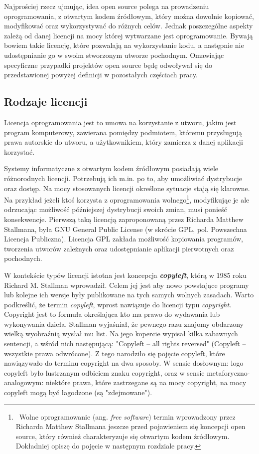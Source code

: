 \documentclass{article}
\begin{document}
Najprościej rzecz ujmując, idea open source polega na prowadzeniu oprogramowania, z otwartym kodem źródłowym, który można dowolnie kopiować, modyfikować oraz wykorzystywać do różnych celów. Jednak poszczególne aspekty zależą od danej licencji na mocy której wytwarzane jest oprogramowanie. Bywają bowiem takie licencję, które pozwalają na wykorzystanie kodu, a następnie nie udostępnianie go w swoim stworzonym utworze pochodnym. Omawiając specyficzne przypadki projektów open source będę odwoływał się do przedstawionej powyżej definicji w pozostałych częściach pracy.

\subsection{Rodzaje licencji}

\hspace{4mm} Licencja oprogramowania jest to umowa na korzystanie z utworu, jakim jest program komputerowy, zawierana pomiędzy podmiotem, któremu przysługują prawa autorskie do utworu, a użytkownikiem, który zamierza z danej aplikacji korzystać\cite{wikipedia}.

Systemy informatyczne z otwartym kodem źródłowym posiadają wiele różnorodnych licencji. Potrzebują ich m.in. po to, aby umożliwiać dystrybucje oraz dostęp. Na mocy stosowanych licencji określone sytuacje stają się klarowne. Na przykład jeżeli ktoś korzysta z oprogramowania wolnego\footnote{\, Wolne oprogramowanie (ang. \emph{free software}) termin wprowadzony przez Richarda Matthew Stallmana jeszcze przed pojawieniem się koncepcji open source, który również charakteryzuje się otwartym kodem źródłowym. Dokładniej opiszę do pojęcie w następnym rozdziale pracy.}, modyfikując je ale odrzucając możliwość późniejszej dystrybucji swoich zmian, musi ponieść konsekwencje. Pierwszą taką licencją zaproponowaną przez Richarda Matthew Stallmana, była GNU General Public License (w skrócie GPL, pol. Powszechna Licencja Publiczna)\cite{Kotula}. Licencja GPL zakłada możliwość kopiowania programów, tworzenia utworów zależnych oraz udostępnianie aplikacji pierwotnych oraz pochodnych\cite{wikipedia}.

W kontekście typów licencji istotna jest koncepcja \textbf{\emph{copyleft}}, którą w 1985 roku Richard M. Stallman wprowadził. Celem jej jest aby nowo powstające programy lub kolejne ich wersje były publikowane na tych samych wolnych zasadach. Warto podkreślić, że termin \emph{copyleft}, wprost nawiązuje do licencji typu \emph{copyright}. Copyright jest to formuła określająca kto ma prawo do wydawania lub wykonywania dzieła\cite{sjp}. Stallman wyjaśniał, że pewnego razu znajomy obdarzony wielką wyobraźnią wysłał mu list. Na jego kopercie wypisał kilka zabawnych sentencji, a wśród nich następującą: "Copyleft  – all rights reversed" (Copyleft  – wszystkie prawa odwrócone). Z tego narodziło się pojęcie copyleft, które nawiązywało do terminu copyright na dwa sposoby. W sensie dosłownym: logo copyleft było lustrzanym odbiciem znaku copyright, oraz w sensie metaforyczno-analogowym: niektóre prawa, które zastrzegane są na mocy copyright, na mocy copyleft mogą być łagodzone (są "zdejmowane")\cite{Kotula}.
\end{document}

